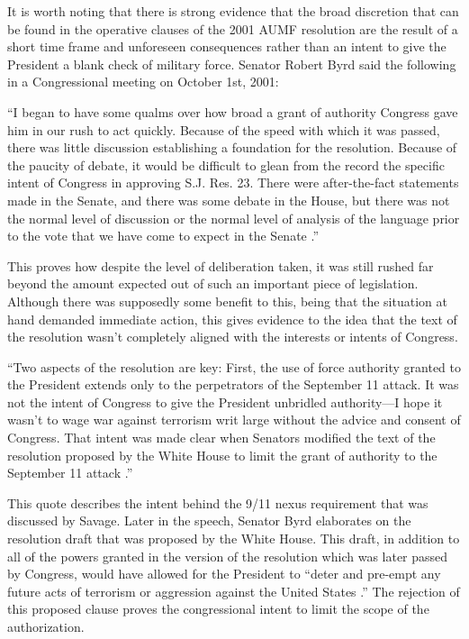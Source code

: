 \documentclass[12pt]{article}
\begin{document}
It is worth noting that there is strong evidence that the broad discretion that can be found in the operative clauses of the 2001 AUMF resolution are the result of a short time frame and unforeseen consequences rather than an intent to give the President a blank check of military force.
Senator Robert Byrd said the following in a Congressional meeting on October 1st, 2001:

\begin{displayquote}
``I began to have some qualms over how broad a grant of authority Congress
gave him in our rush to act quickly.
Because of the speed with which it was passed, there was little discussion establishing a foundation for the resolution.
Because of the paucity of debate, it would be difficult to glean from the
record the specific intent of Congress in approving S.J. Res. 23.
There were after-the-fact statements made in the Senate, and there was some debate in the House, but there was not the normal level of discussion or the normal
level of analysis of the language prior to the vote that we have come to expect in the Senate \autocite[S9949]{byrd2001a}.''
\end{displayquote}

\noindent
This proves how despite the level of deliberation taken, it was still rushed far beyond the amount expected out of such an important piece of legislation.
Although there was supposedly some benefit to this, being that the situation at hand demanded immediate action, this gives evidence to the idea that the text of the resolution wasn't completely aligned with the interests or intents of Congress.

\begin{displayquote}
``Two aspects of the resolution are key: First, the use of force authority granted to the President extends only to the perpetrators of the September 11 attack.
It was not the intent of Congress to give the President unbridled authority—I hope it wasn’t to wage war against terrorism writ large without the advice and consent of Congress.
That intent was made clear when Senators modified the text of the resolution proposed by the White House to limit the grant of authority to the September 11 attack \autocite[S9949]{byrd2001a}.''
\end{displayquote}

\noindent
This quote describes the intent behind the 9/11 nexus requirement that was discussed by Savage.
Later in the speech, Senator Byrd elaborates on the resolution draft that was proposed by the White House.
This draft, in addition to all of the powers granted in the version of the resolution which was later passed by Congress, would have allowed for the President to ``deter and pre-empt any future acts of terrorism or aggression against the United States \autocite[S9949]{byrd2001a}.''
The rejection of this proposed clause proves the congressional intent to limit the scope of the authorization.
\end{document}
